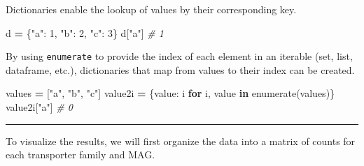 \documentclass[
]{book}
\newenvironment{Shaded}{\begin{snugshade}}{\end{snugshade}}
\newcommand{\BuiltInTok}[1]{#1}
\newcommand{\CommentTok}[1]{\textcolor[rgb]{0.56,0.35,0.01}{\textit{#1}}}
\newcommand{\ControlFlowTok}[1]{\textcolor[rgb]{0.13,0.29,0.53}{\textbf{#1}}}
\newcommand{\DecValTok}[1]{\textcolor[rgb]{0.00,0.00,0.81}{#1}}
\newcommand{\KeywordTok}[1]{\textcolor[rgb]{0.13,0.29,0.53}{\textbf{#1}}}
\newcommand{\NormalTok}[1]{#1}
\newcommand{\OperatorTok}[1]{\textcolor[rgb]{0.81,0.36,0.00}{\textbf{#1}}}
\newcommand{\StringTok}[1]{\textcolor[rgb]{0.31,0.60,0.02}{#1}}
\begin{document}
Dictionaries enable the lookup of values by their corresponding key.

\begin{Shaded}
\begin{Highlighting}[numbers=left,,]
\NormalTok{d }\OperatorTok{=}\NormalTok{ \{}\StringTok{"a"}\NormalTok{: }\DecValTok{1}\NormalTok{, }\StringTok{"b"}\NormalTok{: }\DecValTok{2}\NormalTok{, }\StringTok{"c"}\NormalTok{: }\DecValTok{3}\NormalTok{\}}
\NormalTok{d[}\StringTok{"a"}\NormalTok{] }\CommentTok{\# 1}
\end{Highlighting}
\end{Shaded}

By using \texttt{enumerate} to provide the index of each element in an iterable (set, list, dataframe, etc.),
dictionaries that map from values to their index can be created.

\begin{Shaded}
\begin{Highlighting}[numbers=left,,]
\NormalTok{values }\OperatorTok{=}\NormalTok{ [}\StringTok{"a"}\NormalTok{, }\StringTok{"b"}\NormalTok{, }\StringTok{"c"}\NormalTok{]}
\NormalTok{value2i }\OperatorTok{=}\NormalTok{ \{value: i }\ControlFlowTok{for}\NormalTok{ i, value }\KeywordTok{in} \BuiltInTok{enumerate}\NormalTok{(values)\}}
\NormalTok{value2i[}\StringTok{"a"}\NormalTok{] }\CommentTok{\# 0}
\end{Highlighting}
\end{Shaded}

\begin{center}\rule{0.5\linewidth}{0.5pt}\end{center}

To visualize the results, we will first organize the data into a matrix of counts for each transporter family and MAG.
\end{document}
